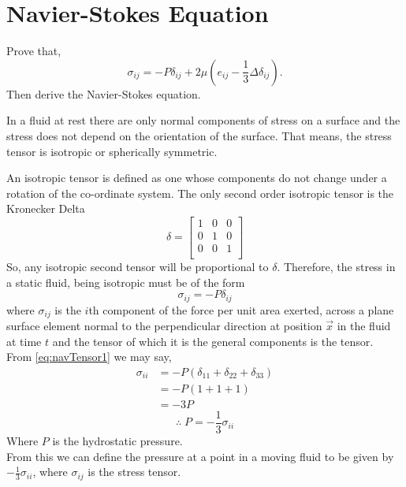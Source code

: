 \documentclass[../main-sheet.tex]{subfiles}
\begin{document}
\chapter{Navier-Stokes Equation}
\begin{prob}
    Prove that,
    \[\sigma_{ij}=-P\delta_{ij}+2\mu(e_{ij}-\frac{1}{3}\Delta \delta_{ij}).\]
    Then derive the Navier-Stokes equation.
\end{prob}
\begin{soln}
    In a fluid at rest there are only normal components of stress on a surface and the stress does not depend on the orientation of the surface. That means, the stress tensor is isotropic or spherically symmetric.

    An isotropic tensor is defined as one whose components do not change under a rotation of the co-ordinate system. The only second order isotropic tensor is the Kronecker Delta
    \[\delta=\begin{bmatrix}
        1&0&0\\
        0&1&0\\
        0&0&1\\
    \end{bmatrix}\]
    So, any isotropic second tensor will be proportional to \(\delta\). Therefore, the stress in a static fluid, being isotropic must be of the form
    \begin{equation}
        \sigma_{ij}=-P\delta_{ij}\label{eq:navTensor1}
    \end{equation}
    where \(\sigma_{ij}\) is the \(i\)th component of the force per unit area exerted, across a plane surface element normal to the perpendicular direction at position \(\vec{x}\) in the fluid at time \(t\) and the tensor of which it is the general components is the tensor.\\
    From \eqref{eq:navTensor1} we may say,
    \begin{align*}
        \sigma_{ii}&=-P (\delta_{11}+\delta_{22}+\delta_{33})\\
        &=-P (1+1+1)\\
        &=-3P
    \end{align*}
    \begin{equation}
        \therefore \; P=-\frac{1}{3}\sigma_{ii} \label{eq:navTensor2}
    \end{equation}
    Where \(P\) is the hydrostatic pressure.\\
    From this we can define the pressure at a point in a moving fluid to be given by \(-\frac{1}{3}\sigma_{ii}\), where \(\sigma_{ij}   \) is the stress tensor.


\end{soln}
\end{document}
